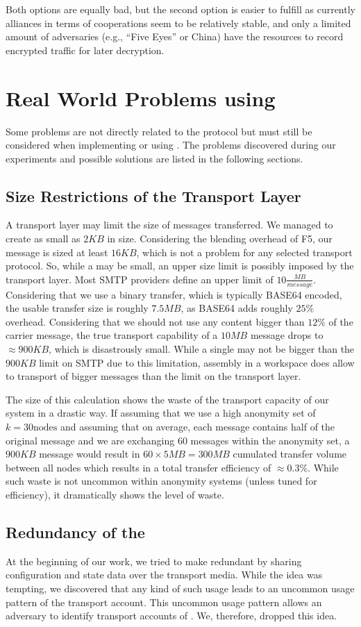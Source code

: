 Both options are equally bad, but the second option is easier to fulfill as currently alliances in terms of cooperations seem to be relatively stable, and only a limited amount of adversaries (e.g., ``Five Eyes'' or China) have the resources to record encrypted traffic for later decryption.

\chapter{Real World Problems using \MessageVortex}\label{sec:realWorldProblems}
Some problems are not directly related to the \MessageVortex{} protocol but must still be considered when implementing or using \MessageVortex. The problems discovered during our experiments and possible solutions are listed in the following sections.

\section{Size Restrictions of the Transport Layer}
A transport layer may limit the size of messages transferred. We managed to create \VortexMessages{} as small as $2KB$ in size. Considering the blending overhead of F5, our message is sized at least $16KB$, which is not a problem for any selected transport protocol. So, while a \VortexMessage{} may be small, an upper size limit is possibly imposed by the transport layer. Most SMTP providers define an upper limit of $10\frac{MB}{message}$. Considering that we use a binary transfer, which is typically BASE64 encoded, the usable transfer size is roughly $7.5MB$, as BASE64 adds roughly $25\%$ overhead. Considering that we should not use any content bigger than $12\%$ of the carrier message, the true transport capability of a $10MB$ message drops to $\approx 900KB$, which is disastrously small. While a single \VortexMessage{} may not be bigger than the $900KB$ limit on SMTP due to this limitation, assembly in a workspace does allow to transport of bigger messages than the limit on the transport layer.

The size of this calculation shows the waste of the transport capacity of our system in a drastic way. If assuming that we use a high anonymity set of $k=30 \text{nodes}$ and assuming that on average, each message contains half of the original message and we are exchanging 60 messages within the anonymity set, a $900KB$ message would result in $60\times 5MB=300MB$ cumulated transfer volume between all nodes which results in a total transfer efficiency of $\approx 0.3\%$. While such waste is not uncommon within anonymity systems (unless tuned for efficiency), it dramatically shows the level of waste.

\section{Redundancy of the \VortexNode}
At the beginning of our work, we tried to make \VortexNodes{} redundant by sharing configuration and state data over the transport media. While the idea was tempting, we discovered that any kind of such usage leads to an uncommon usage pattern of the transport account. This uncommon usage pattern allows an adversary to identify transport accounts of \VortexNodes. We, therefore, dropped this idea. 